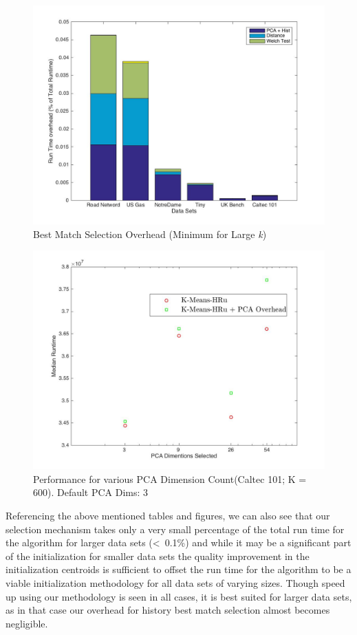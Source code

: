 \begin{figure}[t!]
    \includegraphics[width=\textwidth]{Chapter-5/figs/stacked_overhead_large}
    \caption{Best Match Selection Overhead (Minimum for Large \textit{k})}
    \centering
    \label{fig:selection_overhead_large}
\end{figure}

\begin{figure}[t!]
    \includegraphics[width=\textwidth]{Chapter-5/figs/PCA_results}
    \caption{Performance for various PCA Dimension Count(Caltec 101; K = 600). Default PCA Dims: 3}
    \centering
    \label{fig:pca_overhead}
\end{figure}

Referencing the above mentioned tables and figures, we can also see that our selection mechanism takes only a very small percentage of the total run time for the algorithm for larger data sets (<~0.1\%) and while it may be a significant part of the initialization for smaller data sets the quality improvement in the initialization centroids is sufficient to offset the run time for the algorithm to be a viable initialization methodology for all data sets of varying sizes. 
Though speed up using our methodology is seen in all cases, it is best suited for larger data sets, as in that case our overhead for history best match selection almost becomes negligible.

